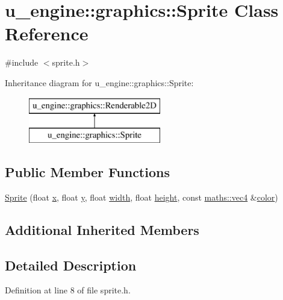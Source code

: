\hypertarget{classu__engine_1_1graphics_1_1_sprite}{}\section{u\+\_\+engine\+:\+:graphics\+:\+:Sprite Class Reference}
\label{classu__engine_1_1graphics_1_1_sprite}


{\ttfamily \#include $<$sprite.\+h$>$}

Inheritance diagram for u\+\_\+engine\+:\+:graphics\+:\+:Sprite\+:\begin{figure}[H]
\begin{center}
\leavevmode
\includegraphics[height=2.000000cm]{classu__engine_1_1graphics_1_1_sprite}
\end{center}
\end{figure}
\subsection*{Public Member Functions}
\begin{DoxyCompactItemize}
\item 
\hyperlink{classu__engine_1_1graphics_1_1_sprite_acf4e11ebb1c16bb0bf54f989dc9fe343}{Sprite} (float \hyperlink{glew_8h_ad77deca22f617d3f0e0eb786445689fc}{x}, float \hyperlink{glew_8h_a9298c7ad619074f5285b32c6b72bfdea}{y}, float \hyperlink{glew_8h_aa105b18f96e6bc2485cb7f576a7fb9ba}{width}, float \hyperlink{glew_8h_aa214bd63e12f7ddf524c83894fcc69a7}{height}, const \hyperlink{structu__engine_1_1maths_1_1vec4}{maths\+::vec4} \&\hyperlink{glew_8h_a3ea846f998d64f079b86052b6c4193a8}{color})
\end{DoxyCompactItemize}
\subsection*{Additional Inherited Members}


\subsection{Detailed Description}


Definition at line 8 of file sprite.\+h.



